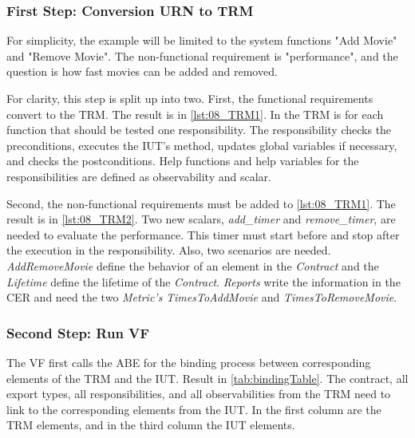\subsubsection{First Step: Conversion URN to TRM}
For simplicity, the example will be limited to the system functions "Add Movie" and "Remove Movie". The non-functional requirement is "performance", and the question is how fast movies can be added and removed.

For clarity, this step is split up into two. First, the functional requirements convert to the TRM. The result is in \autoref{lst:08_TRM1}. In the TRM is for each function that should be tested one responsibility. The responsibility checks the preconditions, executes the IUT's method, updates global variables if necessary, and checks the postconditions. Help functions and help variables for the responsibilities are defined as observability and scalar. 



Second, the non-functional requirements must be added to \autoref{lst:08_TRM1}. The result is in \autoref{lst:08_TRM2}. Two new scalars, \textit{add\_timer} and \textit{remove\_timer}, are needed to evaluate the performance. This timer must start before and stop after the execution in the responsibility. Also, two scenarios are needed. \textit{AddRemoveMovie} define the behavior of an element in the \textit{Contract} and the \textit{Lifetime} define the lifetime of the \textit{Contract}. \textit{Reports} write the information in the CER and need the two \textit{Metric's} \textit{TimesToAddMovie} and \textit{TimesToRemoveMovie}.



\subsubsection{Second Step: Run VF}

The VF first calls the ABE for the binding process between corresponding elements of the TRM and the IUT. Result in \autoref{tab:bindingTable}. The contract, all export types, all responsibilities, and all observabilities from the TRM need to link to the corresponding elements from the IUT. In the first column are the TRM elements, and in the third column the IUT elements.

